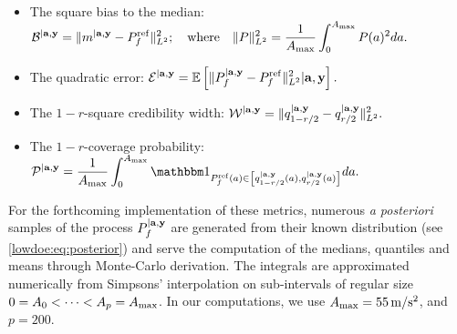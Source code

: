     \begin{itemize}
        \item The square bias to the median: $\displaystyle{\mathcal{B}^{|\mathbf{a},\mathbf{y}} = \|m^{|\mathbf{a},\mathbf{y}}- P_f^{\mathrm{ref}}\|^2_{L^2};\quad \text{where}\quad\|P\|^2_{L^2} = \frac{1}{A_{\max}}\int_{0}^{A_{\max}}P(a)^2 d a.}$
        \item The quadratic error: $\displaystyle{\mathcal{E}^{|\mathbf{a},\mathbf{y}} = \mathbb{E}\left[\|P_f^{|\mathbf{a},\mathbf{y}}-P_f^{\mathrm{ref}} \|^2_{L^2}|\mathbf{a},\mathbf{y}\right].}$
        \item The $1-r$-square credibility width: $\displaystyle{\mathcal{W}^{|\mathbf{a},\mathbf{y}} = \|q_{1-{r/2}}^{|\mathbf{a},\mathbf{y}} - q_{{r/2}}^{|\mathbf{a},\mathbf{y}}\|_{L^2}^2  .}$
        \item The $1-r$-coverage probability: %
        $\displaystyle{\cP^{|\mbf a,\mbf y} = \frac{1}{A_{\max}}\int_0^{A_{\max}}\indic_{P_f^{\mathrm{ref}}(a)\in \left[q_{1-{r/2}}^{|\mbf a,\mbf y}(a), q_{{r/2}}^{|\mbf a,\mbf y}(a) \right] } d a.}$
    \end{itemize}
For the forthcoming implementation of these metrics, numerous \emph{a posteriori} samples of the process $P_f^{|\mathbf{a},\mathbf{y}}$ are generated from their known distribution (see \cref{lowdoe:eq:posterior}) and serve the computation of the medians, quantiles and means through Monte-Carlo derivation. The integrals are approximated numerically from Simpsons' interpolation
{on sub-intervals of regular size  $0=A_0<\dots<A_p=A_{\rm max}$. In our computations, we use  $A_{\rm max}=55\,\mathrm{m/s^2}$, and $p=200$.}




